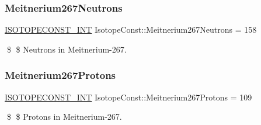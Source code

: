 \subsubsection{\texorpdfstring{Meitnerium267\+Neutrons}{Meitnerium267Neutrons}}
{\footnotesize\ttfamily \mbox{\hyperlink{group___isotope_const-_macros_ga5f18360b3e99483a35c32d789e62621c}{I\+S\+O\+T\+O\+P\+E\+C\+O\+N\+S\+T\+\_\+\+I\+NT}} Isotope\+Const\+::\+Meitnerium267\+Neutrons = 158}

\$ \$ Neutrons in Meitnerium-\/267. \mbox{\label{group___isotope_const-_meitnerium-_mt267_ga6cb0d7e77cac8afec00654a319bbb1d0}} 
\subsubsection{\texorpdfstring{Meitnerium267\+Protons}{Meitnerium267Protons}}
{\footnotesize\ttfamily \mbox{\hyperlink{group___isotope_const-_macros_ga5f18360b3e99483a35c32d789e62621c}{I\+S\+O\+T\+O\+P\+E\+C\+O\+N\+S\+T\+\_\+\+I\+NT}} Isotope\+Const\+::\+Meitnerium267\+Protons = 109}

\$ \$ Protons in Meitnerium-\/267. 